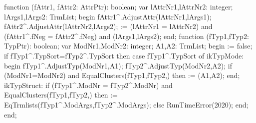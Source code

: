 function (fAttr1, fAttr2: AttrPtr): boolean;
var
   lAttrNr1,lAttrNr2: integer;
   lArgs1,lArgs2: TrmList;
begin
   fAttr1^.AdjustAttr(lAttrNr1,lArgs1);
   fAttr2^.AdjustAttr(lAttrNr2,lArgs2);
    := (lAttrNr1 = lAttrNr2) and
      (fAttr1^.fNeg = fAttr2^.fNeg) and
      (lArgs1,lArgs2);
end;
\eatline
{}\nwendcode{}\nwdocspar
\nwenddocs{}\endmoddef\nwstartdeflinemarkup\nwenddeflinemarkup
function (fTyp1,fTyp2: TypPtr): boolean;
var
   ModNr1,ModNr2: integer;
   A1,A2: TrmList;
begin
    := false;
   if fTyp1^.TypSort=fTyp2^.TypSort then
      case fTyp1^.TypSort of
         ikTypMode:
            begin
               fTyp1^.AdjustTyp(ModNr1,A1);
               fTyp2^.AdjustTyp(ModNr2,A2);
               if (ModNr1=ModNr2) and EqualClusters(fTyp1,fTyp2,) then
                   := (A1,A2);
            end;
         ikTypStruct:
            if (fTyp1^.ModNr = fTyp2^.ModNr) and
                  EqualClusters(fTyp1,fTyp2,) then
                := EqTrmlists(fTyp1^.ModArgs,fTyp2^.ModArgs);
      else RunTimeError(2020);
      end;
end;
\eatline
{}\nwendcode{}\nwdocspar
\nwenddocs{}\endmoddef\nwstartdeflinemarkup\nwenddeflinemarkup
